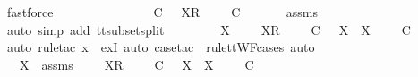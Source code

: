 \begin{isabellebody}
\ fastforce\isanewline
\ \ \isamarkupfalse%
\ \isamarkupfalse%
\ {\isachardoublequoteopen}{\isasymexists}\ {\isasymrho}{\isacharprime}{\isacharprime}\ {\isasymsigma}{\isacharprime}{\isacharprime}{\isachardot}\ {\isasymsigma}\ {\isacharequal}\ {\isasymrho}{\isacharprime}{\isacharprime}\ {\isacharat}\ {\isasymsigma}{\isacharprime}{\isacharprime}\ {\isasymand}\ {\isasymrho}{\isacharprime}\ {\isasymsubseteq}\isactrlsub C\ {\isasymrho}{\isacharprime}{\isacharprime}\ {\isasymand}\ {\isacharbrackleft}X{\isacharbrackright}\isactrlsub R\ {\isacharhash}\ {\isasymsigma}{\isacharprime}\ {\isacharat}\ {\isasymtau}{\isacharprime}\ {\isasymsubseteq}\isactrlsub C\ {\isasymsigma}{\isacharprime}{\isacharprime}{\isachardoublequoteclose}\isanewline
\ \ \ \ \isamarkupfalse%
\ {\isasymtau}{\isacharunderscore}assms\ \isamarkupfalse%
\ {\isacharparenleft}auto\ simp\ add{\isacharcolon}\ tt{\isacharunderscore}subset{\isacharunderscore}split{}{\isacharparenright}\isanewline
\ \ \isamarkupfalse%
\ \isamarkupfalse%
\ {\isachardoublequoteopen}{\isasymexists}\ {\isasymrho}{\isacharprime}{\isacharprime}\ {\isasymsigma}{\isacharprime}{\isacharprime}\ X{\isacharprime}{\isachardot}\ {\isasymsigma}\ {\isacharequal}\ {\isasymrho}{\isacharprime}{\isacharprime}\ {\isacharat}\ {\isacharbrackleft}X{\isacharprime}{\isacharbrackright}\isactrlsub R\ {\isacharhash}\ {\isasymsigma}{\isacharprime}{\isacharprime}\ {\isasymand}\ {\isasymrho}{\isacharprime}\ {\isasymsubseteq}\isactrlsub C\ {\isasymrho}{\isacharprime}{\isacharprime}\ {\isasymand}\ X\ {\isasymsubseteq}\ X{\isacharprime}\ {\isasymand}\ {\isasymsigma}{\isacharprime}\ {\isacharat}\ {\isasymtau}{\isacharprime}\ {\isasymsubseteq}\isactrlsub C\ {\isasymsigma}{\isacharprime}{\isacharprime}{\isachardoublequoteclose}\isanewline
\ \ \ \ \isamarkupfalse%
\ {\isacharparenleft}auto{\isacharcomma}\ rule{\isacharunderscore}tac\ x{\isacharequal}{\isachardoublequoteopen}{\isasymrho}{\isacharprime}{\isacharprime}{\isachardoublequoteclose}\ \ exI{\isacharcomma}\ auto{\isacharcomma}\ case{\isacharunderscore}tac\ {\isasymsigma}{\isacharprime}{\isacharprime}\ rule{\isacharcolon}ttWF{\isachardot}cases{\isacharcomma}\ auto{\isacharparenright}\isanewline
\ \ \isamarkupfalse%
\ \isamarkupfalse%
\ {\isasymrho}{\isacharprime}{\isacharprime}\ {\isasymsigma}{\isacharprime}{\isacharprime}\ X{\isacharprime}\ \ {\isasymsigma}{\isacharunderscore}assms{\isacharcolon}\ {\isachardoublequoteopen}{\isasymsigma}\ {\isacharequal}\ {\isasymrho}{\isacharprime}{\isacharprime}\ {\isacharat}\ {\isacharbrackleft}X{\isacharprime}{\isacharbrackright}\isactrlsub R\ {\isacharhash}\ {\isasymsigma}{\isacharprime}{\isacharprime}\ {\isasymand}\ {\isasymrho}{\isacharprime}\ {\isasymsubseteq}\isactrlsub C\ {\isasymrho}{\isacharprime}{\isacharprime}\ {\isasymand}\ X\ {\isasymsubseteq}\ X{\isacharprime}\ {\isasymand}\ {\isasymsigma}{\isacharprime}\ {\isacharat}\ {\isasymtau}{\isacharprime}\ {\isasymsubseteq}\isactrlsub C\ {\isasymsigma}{\isacharprime}{\isacharprime}{\isachardoublequoteclose}\isanewline

\end{isabellebody}
